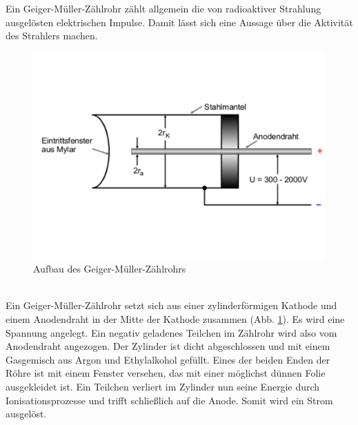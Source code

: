 Ein Geiger-Müller-Zählrohr zählt allgemein die von radioaktiver Strahlung ausgelösten elektrischen Impulse.
Damit lässt sich eine Aussage über die Aktivität des Strahlers machen.
\begin{figure}[h!]
  \centering
  \includegraphics[width=\textwidth]{703geiger.pdf}
  \caption{Aufbau des Geiger-Müller-Zählrohrs \cite{1}}
  \label{fig:geiger}
\end{figure}
\\Ein Geiger-Müller-Zählrohr setzt sich aus einer zylinderförmigen Kathode und einem Anodendraht in der Mitte der Kathode zusammen (Abb. \ref{fig:geiger}).
Es wird eine Spannung angelegt.
Ein negativ geladenes Teilchen im Zählrohr wird also vom Anodendraht angezogen.
Der Zylinder ist dicht abgeschlossen und mit einem Gasgemisch aus Argon und Ethylalkohol gefüllt.
Eines der beiden Enden der Röhre ist mit einem Fenster versehen, das mit einer möglichst dünnen Folie ausgekleidet ist.
Ein Teilchen verliert im Zylinder nun seine Energie durch Ionisationsprozesse und trifft schließlich auf die Anode.
Somit wird ein Strom ausgelöst.
